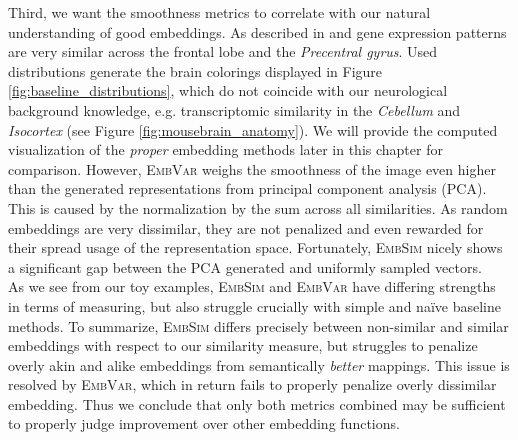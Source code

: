\documentclass[]{article}
\begin{document}
Third, we want the smoothness metrics to correlate with our natural understanding of good embeddings. As described in \citet{ValkShapingBrainStructure2020} and \citet{Partel2020} gene expression patterns are very similar across the frontal lobe and the \textit{Precentral gyrus}. Used distributions generate the brain colorings displayed in Figure \ref{fig:baseline_distributions}, which do not coincide with our neurological background knowledge, e.g. transcriptomic similarity in the \textit{Cebellum} and \textit{Isocortex} (see Figure \ref{fig:mousebrain_anatomy}). We will provide the computed visualization of the \textit{proper} embedding methods later in this chapter for comparison. However, \textsc{EmbVar} weighs the smoothness of the image even higher than the generated representations from principal component analysis (PCA). This is caused by the normalization by the sum across all similarities. As random embeddings are very dissimilar, they are not penalized and even rewarded for their spread usage of the representation space. Fortunately, \textsc{EmbSim} nicely shows a significant gap between the PCA generated and uniformly sampled vectors.\\

As we see from our toy examples, \textsc{EmbSim} and \textsc{EmbVar} have differing strengths in terms of measuring, but also struggle crucially with simple and na\"ive baseline methods. To summarize, \textsc{EmbSim} differs precisely between non-similar and similar embeddings with respect to our similarity measure, but struggles to penalize overly akin and alike embeddings from semantically \textit{better} mappings. This issue is resolved by \textsc{EmbVar}, which in return fails to properly penalize overly dissimilar embedding. Thus we conclude that only both metrics combined may be sufficient to properly judge improvement over other embedding functions.
\end{document}
